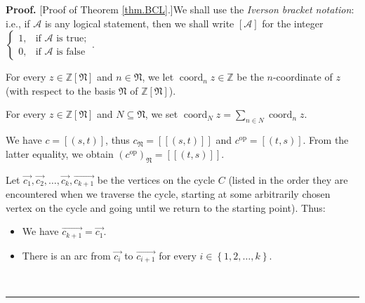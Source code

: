 \documentclass[numbers=enddot,12pt,final,onecolumn,notitlepage,abstracton]{scrartcl}%
\theoremstyle{definition}
\newenvironment{proof}[1][Proof]{\noindent\textbf{#1.} }{\ \rule{0.5em}{0.5em}}
\let\sumnonlimits\sum
\renewcommand{\sum}{\sumnonlimits\limits}
\begin{document}
\begin{proof}
[Proof of Theorem \ref{thm.BCL}.]We shall use the \emph{Iverson bracket
notation}: i.e., if $\mathcal{A}$ is any logical statement, then we shall
write $\left[  \mathcal{A}\right]  $ for the integer $%
\begin{cases}
1, & \text{if }\mathcal{A}\text{ is true};\\
0, & \text{if }\mathcal{A}\text{ is false}%
\end{cases}
$.

For every $z\in\mathbb{Z}\left[  \mathfrak{N}\right]  $ and $n\in\mathfrak{N}%
$, we let $\operatorname*{coord}\nolimits_{n}z\in\mathbb{Z}$ be the
$n$-coordinate of $z$ (with respect to the basis $\mathfrak{N}$ of
$\mathbb{Z}\left[  \mathfrak{N}\right]  $).

For every $z\in\mathbb{Z}\left[  \mathfrak{N}\right]  $ and $N\subseteq
\mathfrak{N}$, we set $\operatorname*{coord}\nolimits_{N}z=\sum_{n\in
N}\operatorname*{coord}\nolimits_{n}z$.

We have $c=\left[  \left(  s,t\right)  \right]  $, thus $c_{\mathfrak{N}%
}=\left[  \left[  \left(  s,t\right)  \right]  \right]  $ and
$c^{\operatorname{op}}=\left[  \left(  t,s\right)  \right]  $. From the latter
equality, we obtain $\left(  c^{\operatorname*{op}}\right)  _{\mathfrak{N}%
}=\left[  \left[  \left(  t,s\right)  \right]  \right]  $.

Let $\overrightarrow{c_{1}},\overrightarrow{c_{2}},\ldots
,\overrightarrow{c_{k}},\overrightarrow{c_{k+1}}$ be the vertices on the cycle
$C$ (listed in the order they are encountered when we traverse the cycle,
starting at some arbitrarily chosen vertex on the cycle and going until we
return to the starting point). Thus:

\begin{itemize}
\item We have $\overrightarrow{c_{k+1}}=\overrightarrow{c_{1}}$.

\item There is an arc from $\overrightarrow{c_{i}}$ to
$\overrightarrow{c_{i+1}}$ for every $i\in\left\{  1,2,\ldots,k\right\}  $.
\end{itemize}


\end{proof}
\end{document}
